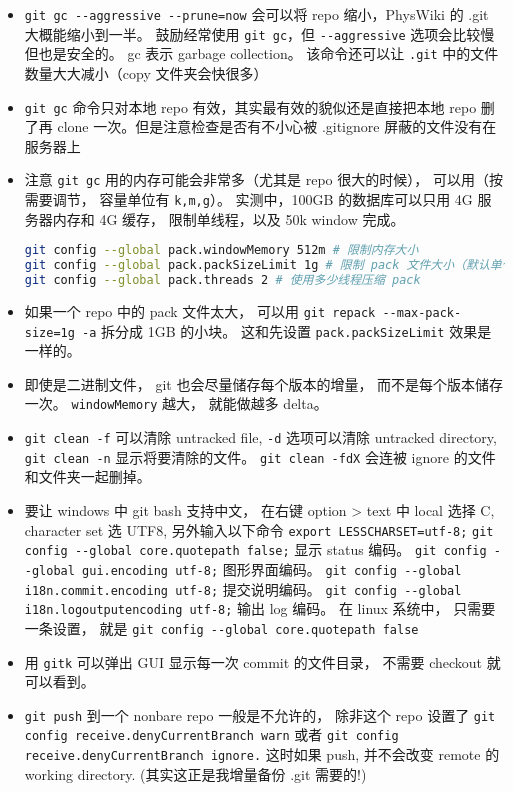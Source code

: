 \begin{itemize}
\item \verb`git gc --aggressive --prune=now` 会可以将 repo 缩小，PhysWiki 的 .git 大概能缩小到一半。 鼓励经常使用 \verb`git gc`，但 \verb`--aggressive` 选项会比较慢但也是安全的。 gc 表示 garbage collection。 该命令还可以让 \verb`.git` 中的文件数量大大减小（copy 文件夹会快很多）
\item \verb`git gc` 命令只对本地 repo 有效，其实最有效的貌似还是直接把本地 repo 删了再 clone 一次。但是注意检查是否有不小心被 .gitignore 屏蔽的文件没有在服务器上
\item 注意 \verb`git gc` 用的内存可能会非常多（尤其是 repo 很大的时候）， 可以用（按需要调节， 容量单位有 \verb`k,m,g`）。 实测中，100GB 的数据库可以只用 4G 服务器内存和 4G 缓存， 限制单线程，以及 50k window 完成。
\begin{lstlisting}[language=bash]
git config --global pack.windowMemory 512m # 限制内存大小
git config --global pack.packSizeLimit 1g # 限制 pack 文件大小（默认单个文件）
git config --global pack.threads 2 # 使用多少线程压缩 pack
\end{lstlisting}
\item 如果一个 repo 中的 pack 文件太大， 可以用 \verb`git repack --max-pack-size=1g -a` 拆分成 1GB 的小块。 这和先设置 \verb`pack.packSizeLimit` 效果是一样的。
\item 即使是二进制文件， git 也会尽量储存每个版本的增量， 而不是每个版本储存一次。 \verb`windowMemory` 越大， 就能做越多 delta。
\item \verb`git clean -f` 可以清除 untracked file, \verb`-d` 选项可以清除 untracked directory,  \verb`git clean -n` 显示将要清除的文件。 \verb`git clean -fdX` 会连被 ignore 的文件和文件夹一起删掉。
\item 要让 windows 中 git bash 支持中文， 在右键 option > text 中 local 选择 C, character set 选 UTF8, 另外输入以下命令
\verb`export LESSCHARSET=utf-8;` \verb`git config --global core.quotepath false;`     显示 status 编码。
\verb`git config --global gui.encoding utf-8;`    图形界面编码。
\verb`git config --global i18n.commit.encoding utf-8;`   提交说明编码。
\verb`git config --global i18n.logoutputencoding utf-8;` 输出 log 编码。
在 linux 系统中， 只需要一条设置， 就是
\verb`git config --global core.quotepath false`
\item 用 \verb`gitk` 可以弹出 GUI 显示每一次 commit 的文件目录， 不需要 checkout 就可以看到。
\item \verb`git push` 到一个 nonbare repo 一般是不允许的， 除非这个 repo 设置了 \verb`git config receive.denyCurrentBranch warn` 或者 \verb`git config receive.denyCurrentBranch ignore.` 这时如果 push, 并不会改变 remote 的 working directory. (其实这正是我增量备份 .git 需要的!)

\end{itemize}
